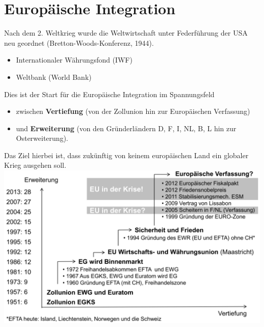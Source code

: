 \section{Europäische Integration}
\begin{multicols}{2}
	Nach dem 2. Weltkrieg wurde die Weltwirtschaft unter Federführung der USA neu geordnet (Bretton-Woods-Konferenz, 1944). 
	\begin{itemize}
		\item Internationaler Währungsfond (IWF)
		\item Weltbank (World Bank)
	\end{itemize}
	Dies ist der Start für die Europäische Integration im Spannungsfeld
	\begin{itemize}
		\item zwischen \textbf{Vertiefung} (von der Zollunion hin zur Europäischen Verfassung)
		\item und \textbf{Erweiterung} (von den Gründerländern D, F, I, NL, B, L hin zur Osterweiterung).
	\end{itemize}
	Das Ziel hierbei ist, dass zukünftig von keinem europäischen Land ein globaler Krieg ausgehen soll.\\
	
	\vfill\null
	\columnbreak
	\includegraphics[width=\linewidth]{images/euintegration.png}
\end{multicols}

